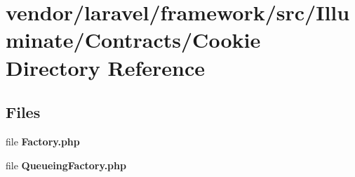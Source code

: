 \section{vendor/laravel/framework/src/\+Illuminate/\+Contracts/\+Cookie Directory Reference}
\label{dir_011e912c7f8b2f8244d7ac5179635526}
\subsection*{Files}
\begin{DoxyCompactItemize}
\item 
file {\bf Factory.\+php}
\item 
file {\bf Queueing\+Factory.\+php}
\end{DoxyCompactItemize}
